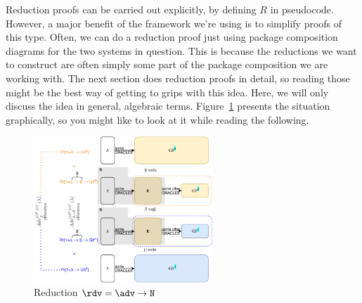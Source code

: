      Reduction proofs can be carried out explicitly, by defining $R$ in pseudocode. However, a major benefit of the framework we're using is to simplify proofs of this type. Often, we can do a reduction proof just using package composition diagrams for the two systems in question. This is because the reductions we want to construct are often simply some part of the package composition we are working with. The next section does reduction proofs in detail, so reading those might be the best way of getting to grips with this idea. Here, we will only discuss the idea in general, algebraic terms. Figure~\ref{fig:reduction-example} presents the situation graphically, so you might like to look at it while reading the following.

      \begin{figure}
            \vspace{-0.5cm}
            \begin{center}
                  \includegraphics[width=0.6\textwidth]{figs/reduction}
                  \caption{\label{fig:reduction-example}Reduction $\rdv=\adv\circ\M{N}$}
            \end{center}
            \vspace{-0.5cm}
      \end{figure}

